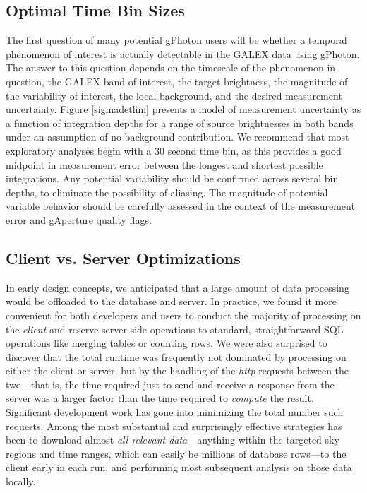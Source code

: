 \documentclass[preprint]{aastex}
\begin{document}
\subsection{Optimal Time Bin Sizes}
\label{optbinsize}
The first question of many potential gPhoton users will be whether a temporal phenomenon of interest is actually detectable in the GALEX data using gPhoton. The answer to this question depends on the timescale of the phenomenon in question, the GALEX band of interest, the target brightness, the magnitude of the variability of interest, the local background, and the desired measurement uncertainty. Figure \ref{sigmadetlim} presents a model of measurement uncertainty as a function of integration depths for a range of source brightnesses in both bands under an assumption of no background contribution. We recommend that most exploratory analyses begin with a 30 second time bin, as this provides a good midpoint in measurement error between the longest and shortest possible integrations. Any potential variability should be confirmed across several bin depths, to eliminate the possibility of aliasing. The magnitude of potential variable behavior should be carefully assessed in the context of the measurement error and gAperture quality flags.

\subsection{Client vs. Server Optimizations}
\label{speedopt}
In early design concepts, we anticipated that a large amount of data processing would be offloaded to the database and server. In practice, we found it more convenient for both developers and users to conduct the majority of processing on the \emph{client} and reserve server-side operations to standard, straightforward SQL operations like merging tables or counting rows. We were also surprised to discover that the total runtime was frequently not dominated by processing on either the client or server, but by the handling of the \emph{http} requests between the two---that is, the time required just to send and receive a response from the server was a larger factor than the time required to \emph{compute} the result. Significant development work has gone into minimizing the total number such requests. Among the most substantial and surprisingly effective strategies has been to download almost \emph{all relevant data}---anything within the targeted sky regions and time ranges, which can easily be millions of database rows---to the client early in each run, and performing most subsequent analysis on those data locally.
\end{document}
